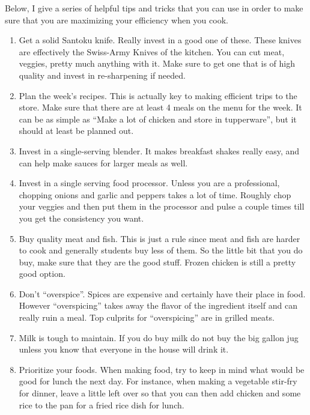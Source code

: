 

Below, I give a series of helpful tips and tricks that you can use in order to make sure that you are maximizing your efficiency when you cook. 

\begin{enumerate}
\item Get a solid Santoku knife. Really invest in a good one of these. These knives are effectively the Swiss-Army Knives of the kitchen. You can cut meat, veggies, pretty much anything with it. Make sure to get one that is of high quality and invest in re-sharpening if needed. 
\item Plan the week's recipes. This is actually key to making efficient trips to the store. Make sure that there are at least 4 meals on the menu for the week. It can be as simple as ``Make a lot of chicken and store in tupperware'', but it should at least be planned out. 
\item Invest in a single-serving blender. It makes breakfast shakes really easy, and can help make sauces for larger meals as well.
\item Invest in a single serving food processor. Unless you are a professional, chopping onions and garlic and peppers takes a lot of time. Roughly chop your veggies and then put them in the processor and pulse a couple times till you get the consistency you want. 
\item Buy quality meat and fish. This is just a rule since meat and fish are harder to cook and generally students buy less of them. So the little bit that you do buy, make sure that they are the good stuff. Frozen chicken is still a pretty good option. 
\item Don't ``overspice''. Spices are expensive and certainly have their place in food. However ``overspicing'' takes away the flavor of the ingredient itself and can really ruin a meal. Top culprits for ``overspicing'' are in grilled meats. 
\item Milk is tough to maintain. If you do buy milk do not buy the big gallon jug unless you know that everyone in the house will drink it. 
\item Prioritize your foods. When making food, try to keep in mind what would be good for lunch the next day. For instance, when making a vegetable stir-fry for dinner, leave a little left over so that you can then add chicken and some rice to the pan for a fried rice dish for lunch. 
\end{enumerate}
